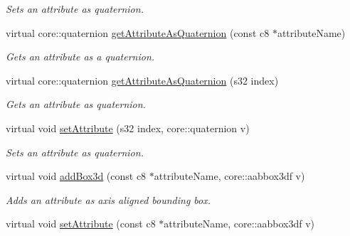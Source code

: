 \begin{DoxyCompactItemize}
\begin{DoxyCompactList}\small\item\em Sets an attribute as quaternion. \end{DoxyCompactList}\item 
virtual core\-::quaternion \hyperlink{classirr_1_1io_1_1_c_attributes_a26861254e55c9bbecc784d67d4e05588}{get\-Attribute\-As\-Quaternion} (const c8 $\ast$attribute\-Name)
\begin{DoxyCompactList}\small\item\em Gets an attribute as a quaternion. \end{DoxyCompactList}\item 
virtual core\-::quaternion \hyperlink{classirr_1_1io_1_1_c_attributes_a56a665e7c5cf42f7e2ed24c6dea52843}{get\-Attribute\-As\-Quaternion} (s32 index)
\begin{DoxyCompactList}\small\item\em Gets an attribute as quaternion. \end{DoxyCompactList}\item 
\hypertarget{classirr_1_1io_1_1_c_attributes_ab8b6b5229743972c3416e678578d62f5}{virtual void \hyperlink{classirr_1_1io_1_1_c_attributes_ab8b6b5229743972c3416e678578d62f5}{set\-Attribute} (s32 index, core\-::quaternion v)}\label{classirr_1_1io_1_1_c_attributes_ab8b6b5229743972c3416e678578d62f5}

\begin{DoxyCompactList}\small\item\em Sets an attribute as quaternion. \end{DoxyCompactList}\item 
\hypertarget{classirr_1_1io_1_1_c_attributes_aae1829fb3654d722af21ad92303d1a1b}{virtual void \hyperlink{classirr_1_1io_1_1_c_attributes_aae1829fb3654d722af21ad92303d1a1b}{add\-Box3d} (const c8 $\ast$attribute\-Name, core\-::aabbox3df v)}\label{classirr_1_1io_1_1_c_attributes_aae1829fb3654d722af21ad92303d1a1b}

\begin{DoxyCompactList}\small\item\em Adds an attribute as axis aligned bounding box. \end{DoxyCompactList}\item 
\hypertarget{classirr_1_1io_1_1_c_attributes_a3882e13694ac1a01ec8257feac32256c}{virtual void \hyperlink{classirr_1_1io_1_1_c_attributes_a3882e13694ac1a01ec8257feac32256c}{set\-Attribute} (const c8 $\ast$attribute\-Name, core\-::aabbox3df v)}\label{classirr_1_1io_1_1_c_attributes_a3882e13694ac1a01ec8257feac32256c}


\end{DoxyCompactItemize}
